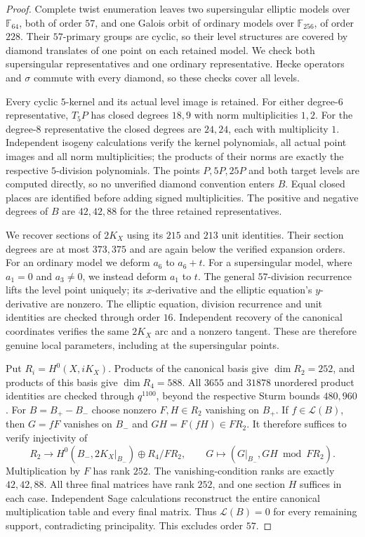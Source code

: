 \begin{proof}
Complete twist enumeration leaves two supersingular elliptic
models over $\mathbb F_{64}$, both of order $57$, and one
Galois orbit of ordinary models over $\mathbb F_{256}$, of order
$228$. Their $57$-primary groups are cyclic, so their level
structures are covered by diamond translates of one point on
each retained model. We check both supersingular representatives
and one ordinary representative. Hecke operators and $\sigma$
commute with every diamond, so these checks cover all levels.

Every cyclic $5$-kernel and its actual level image is retained.
For either degree-$6$ representative, $T_5P$ has closed degrees
$18,9$ with norm multiplicities $1,2$.
For the degree-$8$ representative the closed degrees are $24,24$,
each with multiplicity $1$.
Independent isogeny calculations verify the kernel polynomials,
all actual point images and all norm multiplicities; the products
of their norms are exactly the respective $5$-division polynomials.
The points $P,5P,25P$ and both target levels are computed directly,
so no unverified diamond convention enters $B$.
Equal closed places are identified before adding signed
multiplicities. The positive and negative degrees of $B$ are
$42,42,88$ for the three retained representatives.

We recover sections of $2K_X$ using its $215$ and $213$ unit
identities. Their section degrees are at most $373,375$ and are
again below the verified expansion orders.
For an ordinary model we deform $a_6$ to $a_6+t$.
For a supersingular model, where $a_1=0$ and $a_3\ne0$, we
instead deform $a_1$ to $t$.
The general $57$-division recurrence lifts the level point
uniquely; its $x$-derivative and the elliptic equation's
$y$-derivative are nonzero.
The elliptic equation, division recurrence and unit identities
are checked through order $16$.
Independent recovery of the canonical coordinates verifies the
same $2K_X$ arc and a nonzero tangent. These are therefore genuine
local parameters, including at the supersingular points.

Put $R_i=H^0(X,iK_X)$. Products of the canonical basis give
$\dim R_2=252$, and products of this basis give $\dim R_4=588$.
All $3655$ and $31878$ unordered product identities are checked
through $q^{1100}$, beyond the respective Sturm bounds $480,960$.
For $B=B_+-B_-$ choose nonzero $F,H\in R_2$ vanishing on $B_+$.
If $f\in\mathcal L(B)$, then $G=fF$ vanishes on $B_-$ and
$GH=F(fH)\in FR_2$.
It therefore suffices to verify injectivity of
\[
 R_2\longrightarrow
 H^0(B_-,2K_X|_{B_-})\oplus R_4/FR_2,
 \qquad G\longmapsto(G|_{B_-},GH\bmod FR_2).
\]
Multiplication by $F$ has rank $252$.
The vanishing-condition ranks are exactly $42,42,88$.
All three final matrices have rank $252$, and one section $H$
suffices in each case. Independent Sage calculations reconstruct
the entire canonical multiplication table and every final matrix.
Thus $\mathcal L(B)=0$ for every remaining support, contradicting
principality. This excludes order $57$.
\end{proof}
